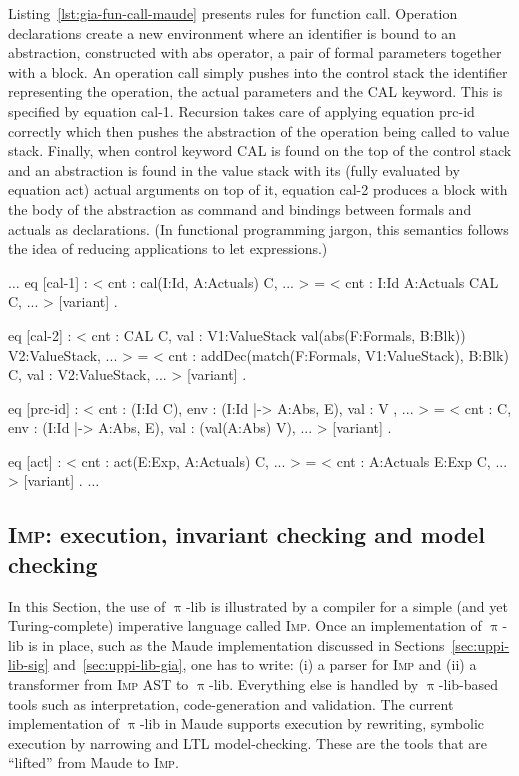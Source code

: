\documentclass{llncs}%
\begin{document}
Listing~\ref{lst:gia-fun-call-maude} presents rules for function call. Operation declarations create a new environment where an identifier is bound to an abstraction, constructed with abs operator, a pair of formal parameters together with a block. An operation call simply pushes into the control stack the identifier representing the operation, the actual parameters and the CAL keyword. This is specified by equation cal-1. Recursion takes care of applying equation prc-id correctly which then pushes the abstraction of the operation being called to value stack. Finally, when control keyword  CAL is found on the top of the control stack and an abstraction is found in the value stack with its (fully evaluated by equation act) actual arguments on top of it, equation cal-2 produces a block with the body of the abstraction as command and bindings between formals and actuals as declarations. (In functional programming jargon, this semantics follows the idea of reducing applications to let expressions.) 
\begin{maude}[caption=$\uppi$-automaton rules for function call, label=lst:gia-fun-call-maude]
    $\ldots$
    eq [cal-1] :
        < cnt : cal(I:Id, A:Actuals) C, ... > =
        < cnt : I:Id A:Actuals CAL C, ... > [variant] .

    eq [cal-2] :
        < cnt : CAL C,
          val : V1:ValueStack
          val(abs(F:Formals, B:Blk)) V2:ValueStack, ... > =
        < cnt : addDec(match(F:Formals, V1:ValueStack), B:Blk) C,
          val : V2:ValueStack, ... > [variant] .

    eq [prc-id] :
        < cnt : (I:Id C),
          env : (I:Id |-> A:Abs, E),
          val : V , ... > =
        < cnt : C,
          env : (I:Id |-> A:Abs, E),
          val : (val(A:Abs) V), ... > [variant] .

    eq [act] :
        < cnt : act(E:Exp, A:Actuals) C, ... > =
        < cnt : A:Actuals E:Exp C, ... > [variant] .
    $\ldots$
\end{maude}

\subsection{\textsc{Imp}: execution, invariant checking and model checking}\label{sec:imp}

In this Section, the use of $\uppi$-lib is illustrated by a compiler for a simple (and yet Turing-complete) imperative language called \textsc{Imp}. Once an implementation of $\uppi$-lib is in place, such as the Maude implementation discussed in Sections~\ref{sec:uppi-lib-sig} and~\ref{sec:uppi-lib-gia}, one has to write: (i) a parser for \textsc{Imp} and (ii) a transformer from \textsc{Imp} AST to $\uppi$-lib. Everything else is handled by $\uppi$-lib-based tools such as interpretation, code-generation and validation. The current implementation of $\uppi$-lib in Maude supports execution by rewriting, symbolic execution by narrowing and LTL model-checking. These are the tools that are ``lifted'' from Maude to \textsc{Imp}.
\end{document}
